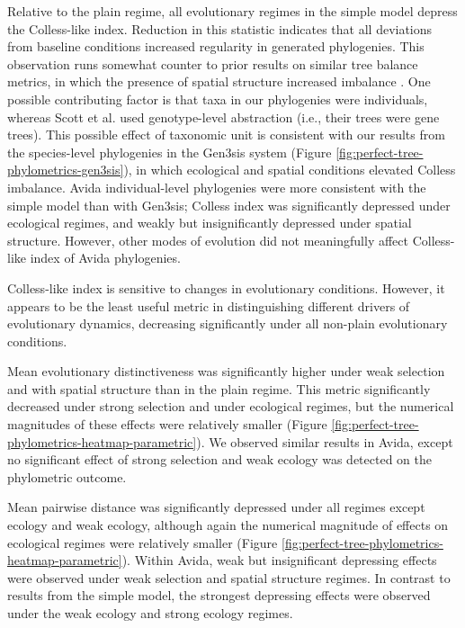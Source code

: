 \noindent
Relative to the plain regime, all evolutionary regimes in the simple model depress the Colless-like index.
Reduction in this statistic indicates that all deviations from baseline conditions increased regularity in generated phylogenies.
This observation runs somewhat counter to prior results on similar tree balance metrics, in which the presence of spatial structure increased imbalance \citep{scottInferringTumorProliferative2020}.
One possible contributing factor is that taxa in our phylogenies were individuals, whereas Scott et al. used genotype-level abstraction (i.e., their trees were gene trees).
This possible effect of taxonomic unit is consistent with our results from the species-level phylogenies in the  Gen3sis system (Figure \ref{fig:perfect-tree-phylometrics-gen3sis}), in which ecological and spatial conditions elevated Colless imbalance.
Avida individual-level phylogenies were more consistent with the simple model than with Gen3sis; Colless index was significantly depressed under ecological regimes, and weakly but insignificantly depressed under spatial structure.
However, other modes of evolution did not meaningfully affect Colless-like index of Avida phylogenies.

Colless-like index is sensitive to changes in evolutionary conditions.
However, it appears to be the least useful metric in distinguishing different drivers of evolutionary dynamics, decreasing significantly under all non-plain evolutionary conditions.

Mean evolutionary distinctiveness was significantly higher under weak selection and with spatial structure than in the plain regime.
This metric significantly decreased under strong selection and under ecological regimes, but the numerical magnitudes of these effects were relatively smaller (Figure \ref{fig:perfect-tree-phylometrics-heatmap-parametric}).
We observed similar results in Avida, except no significant effect of strong selection and weak ecology was detected on the phylometric outcome.

Mean pairwise distance was significantly depressed under all regimes except ecology and weak ecology, although again the numerical magnitude of effects on ecological regimes were relatively smaller (Figure \ref{fig:perfect-tree-phylometrics-heatmap-parametric}).
Within Avida, weak but insignificant depressing effects were observed under weak selection and spatial structure regimes.
In contrast to results from the simple model, the strongest depressing effects were observed under the weak ecology and strong ecology regimes.

